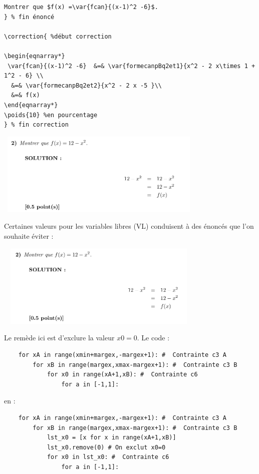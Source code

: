 {\begin{description}
\begin{verbatim}
Montrer que $f(x) =\var{fcan}{(x-1)^2 -6}$. 
} % fin énoncé 

\correction{ %début correction 

\begin{eqnarray*}
 \var{fcan}{(x-1)^2 -6}  &=& \var{formecanpBq2et1}{x^2 - 2 x\times 1 + 1^2 - 6} \\
  &=& \var{formecanpBq2et2}{x^2 - 2 x -5 }\\
  &=& f(x) 
\end{eqnarray*}
\poids{10} %en pourcentage
} % fin correction 
\end{verbatim}

 \includegraphics[width=10cm,height=4cm]{./images/creation_exercice_solve_erreur_01_corrige.png}
 
 \item[Enoncé trop simple : ] Certaines valeurs pour les variables libres (VL) conduisent à des énoncés que l'on souhaite éviter : 
 
 \includegraphics[width=10cm,height=4cm]{./images/creation_exercice_solve_erreur_02.png}
 
Le remède ici est d'exclure la valeur $x0=0$. 
Le code : 
\begin{verbatim}
    for xA in range(xmin+margex,-margex+1): #  Contrainte c3 A
        for xB in range(margex,xmax-margex+1): #  Contrainte c3 B 
            for x0 in range(xA+1,xB): #  Contrainte c6
                for a in [-1,1]: 
\end{verbatim}
en :
\begin{verbatim}
    for xA in range(xmin+margex,-margex+1): #  Contrainte c3 A
        for xB in range(margex,xmax-margex+1): #  Contrainte c3 B 
            lst_x0 = [x for x in range(xA+1,xB)]
            lst_x0.remove(0) # On exclut x0=0
            for x0 in lst_x0: #  Contrainte c6
                for a in [-1,1]: 


\end{verbatim}
\end{description}}
